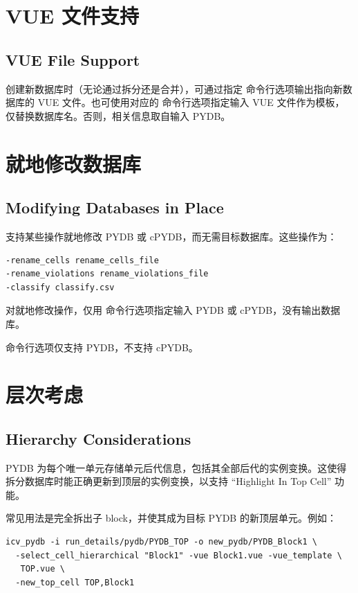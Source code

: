 \section{VUE 文件支持}
\subsection*{VUE File Support}

创建新数据库时（无论通过拆分还是合并），可通过指定  命令行选项输出指向新数据库的 VUE 文件。也可使用对应的  命令行选项指定输入 VUE 文件作为模板，仅替换数据库名。否则，相关信息取自输入 PYDB。

\section{就地修改数据库}
\subsection*{Modifying Databases in Place}

支持某些操作就地修改 PYDB 或 cPYDB，而无需目标数据库。这些操作为：
\begin{lstlisting}[style=shell]
-rename_cells rename_cells_file
-rename_violations rename_violations_file
-classify classify.csv
\end{lstlisting}

对就地修改操作，仅用  命令行选项指定输入 PYDB 或 cPYDB，没有输出数据库。

\begin{noteBox}
 命令行选项仅支持 PYDB，不支持 cPYDB。
\end{noteBox}

\section{层次考虑}
\subsection*{Hierarchy Considerations}

PYDB 为每个唯一单元存储单元后代信息，包括其全部后代的实例变换。这使得拆分数据库时能正确更新到顶层的实例变换，以支持 ``Highlight In Top Cell'' 功能。

常见用法是完全拆出子 block，并使其成为目标 PYDB 的新顶层单元。例如：
\begin{lstlisting}[style=shell]
icv_pydb -i run_details/pydb/PYDB_TOP -o new_pydb/PYDB_Block1 \
  -select_cell_hierarchical "Block1" -vue Block1.vue -vue_template \
   TOP.vue \
  -new_top_cell TOP,Block1
\end{lstlisting}

